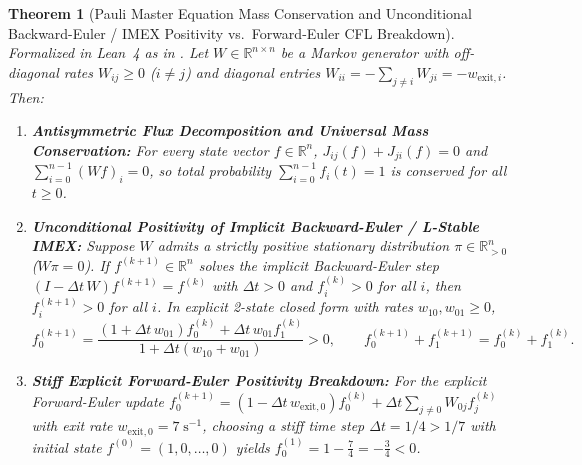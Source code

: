 \documentclass[11pt,a4paper]{article}
\newtheorem{theorem}{Theorem}[section]
\theoremstyle{definition}
\theoremstyle{remark}
\begin{document}
\begin{theorem}[Pauli Master Equation Mass Conservation and Unconditional Backward-Euler / IMEX Positivity vs.\ Forward-Euler CFL Breakdown]
\label{thm:sec1_master_eq}
Formalized in Lean~4 as  in . Let $W \in \mathbb{R}^{n\times n}$ be a Markov generator with off-diagonal rates $W_{ij} \ge 0$ ($i \neq j$) and diagonal entries $W_{ii} = -\sum_{j \neq i} W_{ji} = -w_{\mathrm{exit},i}$. Then:
\begin{enumerate}
  \item \textbf{Antisymmetric Flux Decomposition and Universal Mass Conservation:} For every state vector $f \in \mathbb{R}^n$, $J_{ij}(f) + J_{ji}(f) = 0$ and $\sum_{i=0}^{n-1} (Wf)_i = 0$, so total probability $\sum_{i=0}^{n-1} f_i(t) = 1$ is conserved for all $t \ge 0$.
  \item \textbf{Unconditional Positivity of Implicit Backward-Euler / L-Stable IMEX:} Suppose $W$ admits a strictly positive stationary distribution $\pi \in \mathbb{R}_{>0}^n$ ($W\pi = 0$). If $f^{(k+1)} \in \mathbb{R}^n$ solves the implicit Backward-Euler step $(I - \Delta t\,W)f^{(k+1)} = f^{(k)}$ with $\Delta t > 0$ and $f_i^{(k)} > 0$ for all $i$, then $f_i^{(k+1)} > 0$ for all $i$. In explicit 2-state closed form with rates $w_{10}, w_{01} \ge 0$,
  \begin{equation}
    f_0^{(k+1)} = \frac{(1 + \Delta t\,w_{01})f_0^{(k)} + \Delta t\,w_{01}f_1^{(k)}}{1 + \Delta t(w_{10} + w_{01})} > 0, \qquad f_0^{(k+1)} + f_1^{(k+1)} = f_0^{(k)} + f_1^{(k)}.
  \end{equation}
  \item \textbf{Stiff Explicit Forward-Euler Positivity Breakdown:} For the explicit Forward-Euler update $f_0^{(k+1)} = (1 - \Delta t\,w_{\mathrm{exit},0})f_0^{(k)} + \Delta t\sum_{j\neq 0} W_{0j}f_j^{(k)}$ with exit rate $w_{\mathrm{exit},0} = 7\;\mathrm{s}^{-1}$, choosing a stiff time step $\Delta t = 1/4 > 1/7$ with initial state $f^{(0)} = (1, 0, \dots, 0)$ yields $f_0^{(1)} = 1 - \frac{7}{4} = -\frac{3}{4} < 0$.
\end{enumerate}
\end{theorem}
\end{document}
